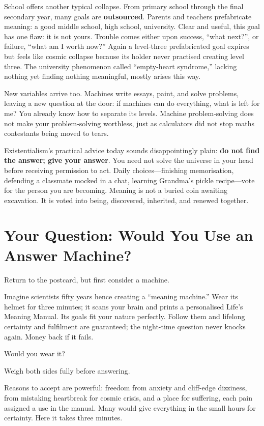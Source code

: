 School offers another typical collapse. From primary school through the final secondary year, many goals are \textbf{outsourced}. Parents and teachers prefabricate meaning: a good middle school, high school, university. Clear and useful, this goal has one flaw: it is not yours. Trouble comes either upon success, ``what next?'', or failure, ``what am I worth now?'' Again a level-three prefabricated goal expires but feels like cosmic collapse because its holder never practised creating level three. The university phenomenon called ``empty-heart syndrome,'' lacking nothing yet finding nothing meaningful, mostly arises this way.

New variables arrive too. Machines write essays, paint, and solve problems, leaving a new question at the door: if machines can do everything, what is left for me? You already know how to separate its levels. Machine problem-solving does not make your problem-solving worthless, just as calculators did not stop maths contestants being moved to tears.

Existentialism's practical advice today sounds disappointingly plain: \textbf{do not find the answer; give your answer}. You need not solve the universe in your head before receiving permission to act. Daily choices---finishing memorisation, defending a classmate mocked in a chat, learning Grandma's pickle recipe---vote for the person you are becoming. Meaning is not a buried coin awaiting excavation. It is voted into being, discovered, inherited, and renewed together.

\section[Your Question: An Answer Machine?]{Your Question: Would You Use an Answer Machine?}
Return to the postcard, but first consider a machine.

Imagine scientists fifty years hence creating a ``meaning machine.'' Wear its helmet for three minutes; it scans your brain and prints a personalised Life's Meaning Manual. Its goals fit your nature perfectly. Follow them and lifelong certainty and fulfilment are guaranteed; the night-time question never knocks again. Money back if it fails.

Would you wear it?

Weigh both sides fully before answering.

Reasons to accept are powerful: freedom from anxiety and cliff-edge dizziness, from mistaking heartbreak for cosmic crisis, and a place for suffering, each pain assigned a use in the manual. Many would give everything in the small hours for certainty. Here it takes three minutes.

